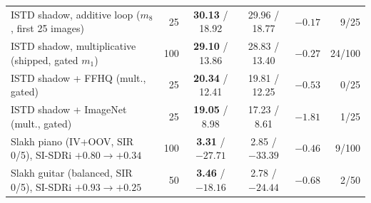 \begin{table}[t]
\begin{tabular}{@{}lrccrr@{}}
        \midrule
        ISTD shadow, additive loop ($m_8$, first 25 images) & 25 & \textbf{30.13} / 18.92 & 29.96 / 18.77 & $-0.17$ & 9/25 \\
        ISTD shadow, multiplicative (shipped, gated $m_1$) & 100 & \textbf{29.10} / 13.86 & 28.83 / 13.40 & $-0.27$ & 24/100 \\
        ISTD shadow + FFHQ (mult., gated) & 25 & \textbf{20.34} / 12.41 & 19.81 / 12.25 & $-0.53$ & 0/25 \\
        ISTD shadow + ImageNet (mult., gated) & 25 & \textbf{19.05} / 8.98 & 17.23 / 8.61 & $-1.81$ & 1/25 \\
        \midrule
        Slakh piano (IV+OOV, SIR 0/5), SI-SDRi $+0.80 \to +0.34$ & 100 & \textbf{3.31} / $-27.71$ & 2.85 / $-33.39$ & $-0.46$ & 9/100 \\
        Slakh guitar (balanced, SIR 0/5), SI-SDRi $+0.93 \to +0.25$ & 50 & \textbf{3.46} / $-18.16$ & 2.78 / $-24.44$ & $-0.68$ & 2/50 \\
        \bottomrule
    \end{tabular}
\end{table}
